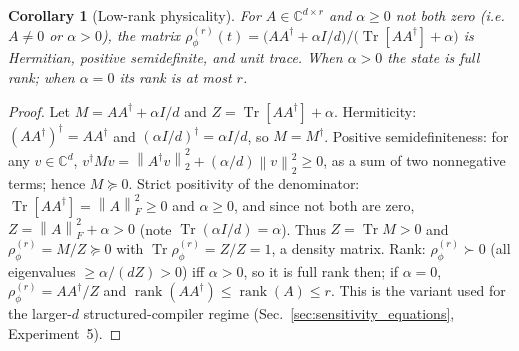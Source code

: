 \documentclass[11pt]{article}
\newtheorem{corollary}[theorem]{Corollary}
\DeclareMathOperator{\Tr}{Tr}
\DeclareMathOperator{\rank}{rank}
\newcommand{\C}{\mathbb{C}}
\newcommand{\norm}[1]{\left\lVert #1 \right\rVert}
\begin{document}
\begin{corollary}[Low-rank physicality]
\label{cor:low_rank}
For $A\in\C^{d\times r}$ and $\alpha\ge0$ not both zero (i.e.\ $A\ne0$ or $\alpha>0$), the matrix $\rho_\phi^{(r)}(t)=\big(A A^\dagger+\alpha I/d\big)/\big(\Tr[AA^\dagger]+\alpha\big)$ is Hermitian, positive semidefinite, and unit trace. When $\alpha>0$ the state is full rank; when $\alpha=0$ its rank is at most $r$.
\end{corollary}
\begin{proof}
Let $M=AA^\dagger+\alpha I/d$ and $Z=\Tr[AA^\dagger]+\alpha$. Hermiticity: $(AA^\dagger)^\dagger=AA^\dagger$ and $(\alpha I/d)^\dagger=\alpha I/d$, so $M=M^\dagger$. Positive semidefiniteness: for any $v\in\C^d$, $v^\dagger M v=\norm{A^\dagger v}_2^2+(\alpha/d)\norm{v}_2^2\ge0$, as a sum of two nonnegative terms; hence $M\succeq0$. Strict positivity of the denominator: $\Tr[AA^\dagger]=\norm{A}_F^2\ge0$ and $\alpha\ge0$, and since not both are zero, $Z=\norm{A}_F^2+\alpha>0$ (note $\Tr(\alpha I/d)=\alpha$). Thus $Z=\Tr M>0$ and $\rho_\phi^{(r)}=M/Z\succeq0$ with $\Tr\rho_\phi^{(r)}=Z/Z=1$, a density matrix. Rank: $\rho_\phi^{(r)}\succ0$ (all eigenvalues $\ge\alpha/(dZ)>0$) iff $\alpha>0$, so it is full rank then; if $\alpha=0$, $\rho_\phi^{(r)}=AA^\dagger/Z$ and $\rank(AA^\dagger)\le\rank(A)\le r$. This is the variant used for the larger-$d$ structured-compiler regime (Sec.~\ref{sec:sensitivity_equations}, Experiment~5).
\end{proof}
\end{document}
